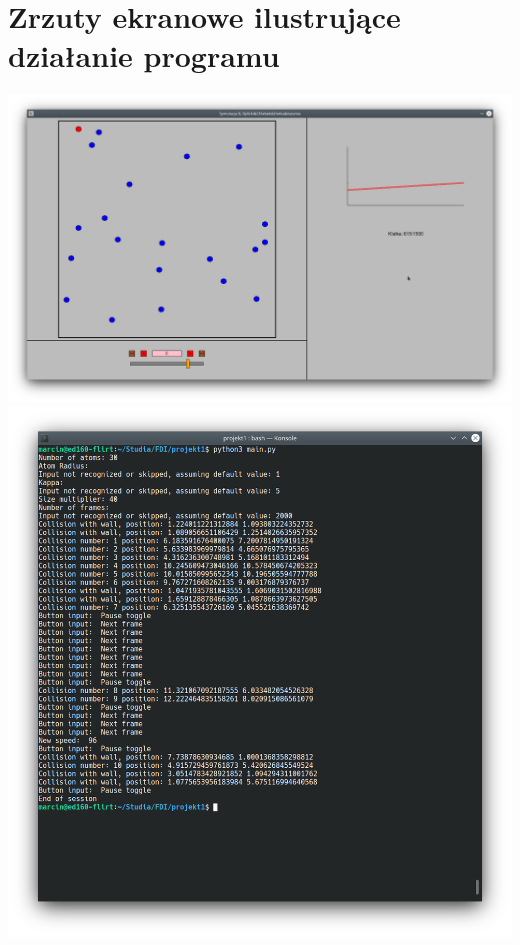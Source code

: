 \documentclass{article}
\begin{document}
\section{Zrzuty ekranowe ilustrujące działanie programu}
    \includegraphics[width=\textwidth]{Screenshot 1.png}\\
    
    \includegraphics[width=\textwidth]{Screenshot 2.png}\\
\end{document}
